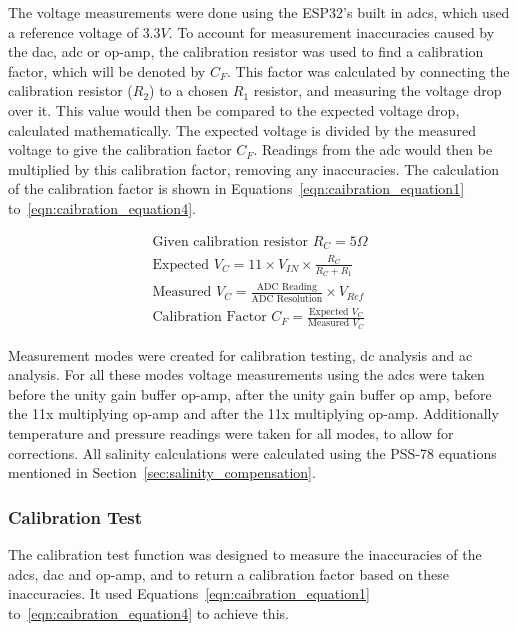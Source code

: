 The voltage measurements were done using the ESP32's built in \gls{adc}s, which used a reference voltage of $3.3V$.
To account for measurement inaccuracies caused by the \gls{dac}, \gls{adc} or op-amp, the calibration resistor was used to find a calibration factor, which will be denoted by $C_F$.
This factor was calculated by connecting the calibration resistor ($R_2$) to a chosen $R_1$ resistor, and measuring the voltage drop over it.
This value would then be compared to the expected voltage drop, calculated mathematically.
The expected voltage is divided by the measured voltage to give the calibration factor $C_F$.
Readings from the \gls{adc} would then be multiplied by this calibration factor, removing any inaccuracies.
The calculation of the calibration factor is shown in Equations~\ref{eqn:caibration_equation1} to~\ref{eqn:caibration_equation4}.

\begin{gather}
    \text{Given calibration resistor }R_{C} = 5\Omega \label{eqn:caibration_equation1} \\
    \text{Expected }V_{C} = 11\times V_{IN}\times\frac{R_C}{R_C+R_1} \\
    \text{Measured }V_{C} = \frac{\text{ADC Reading}}{\text{ADC Resolution}} \times V_{Ref} \\
    \text{Calibration Factor }C_F = \frac{\text{Expected }V_C}{\text{Measured }V_C} \label{eqn:caibration_equation4}
\end{gather}

Measurement modes were created for calibration testing, \gls{dc} analysis and \gls{ac} analysis.
For all these modes voltage measurements using the \gls{adc}s were taken before the unity gain buffer op-amp, after the unity gain buffer op amp, before the 11x multiplying op-amp and after the 11x multiplying op-amp.
Additionally temperature and pressure readings were taken for all modes, to allow for corrections.
All salinity calculations were calculated using the PSS-78 equations mentioned in Section~\ref{sec:salinity_compensation}.

\subsubsection{Calibration Test}
The calibration test function was designed to measure the inaccuracies of the \gls{adc}s, \gls{dac} and op-amp, and to return a calibration factor based on these inaccuracies.
It used Equations~\ref{eqn:caibration_equation1} to~\ref{eqn:caibration_equation4} to achieve this.

